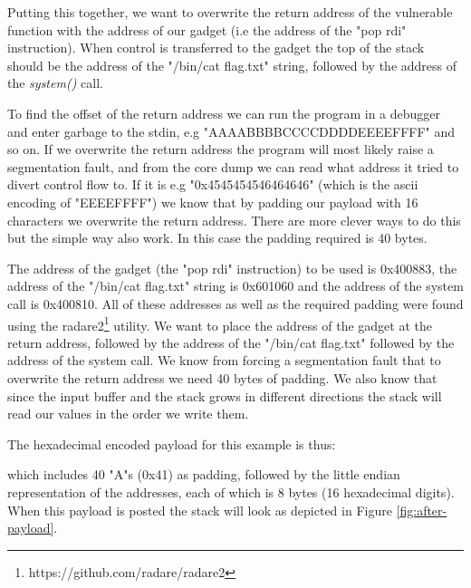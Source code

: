 Putting this together, we want to overwrite the return address of the vulnerable function
with the address of our gadget (i.e the address of the "pop rdi" instruction). When control
is transferred to the gadget the top of the stack should be the address of the "/bin/cat flag.txt"
string, followed by the address of the \textit{system()} call.

To find the offset of the return address we can run the program in a debugger and enter
garbage to the stdin, e.g "AAAABBBBCCCCDDDDEEEEFFFF" and so on. If we overwrite the return
address the program will most likely raise a segmentation fault, and from the core dump we
can read what address it tried to divert control flow to. If it is e.g "0x4545454546464646"
(which is the ascii encoding of "EEEEFFFF") we know that by padding our payload with 16
characters we overwrite the return address. There are more clever ways to do this but the
simple way also work. In this case the padding required is 40 bytes.

The address of the gadget (the "pop rdi" instruction) to be used is 0x400883, the address
of the "/bin/cat flag.txt" string is 0x601060 and the address of the system call is
0x400810. All of these addresses as well as the required padding were found using the
radare2\footnote{https://github.com/radare/radare2} utility. We want to place the address
of the gadget at the return address, followed by the address of the "/bin/cat flag.txt"
followed by the address of the system call. We know from forcing a segmentation fault that
to overwrite the return address we need 40 bytes of padding. We also know that since the
input buffer and the stack grows in different directions the stack will read our values in
the order we write them.

The hexadecimal encoded payload for this example is thus:


which includes 40 "A"s (0x41) as padding, followed by the little endian
representation of the addresses, each of which is 8 bytes (16 hexadecimal digits). When
this payload is posted the stack will look as depicted in Figure \ref{fig:after-payload}.

